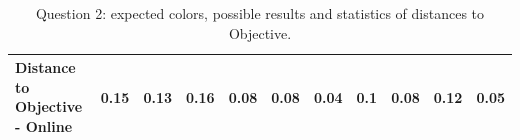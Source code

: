 \begin{table}[H]
{\begin{tabular}{lccccccccccccc}
    \multicolumn{4}{l}{Distance to Objective - Online}                                                                                               & \multicolumn{1}{|c}{0.15}       & \multicolumn{1}{c|}{0.13}    & \multicolumn{1}{|c}{0.16}       & \multicolumn{1}{c|}{0.08}    & \multicolumn{1}{|c}{\textbf{0.08}}       & \multicolumn{1}{c|}{0.04}    & \multicolumn{1}{|c}{0.1}        & \multicolumn{1}{c|}{0.08}    & \multicolumn{1}{|c}{0.12}       & \multicolumn{1}{c|}{0.05}    \\ \hline
    \end{tabular}}
  \caption[Question 2, with expected Results.]{Question 2: expected colors, possible results and statistics of distances to Objective.}
  \vspace{-5pt}
  \label{table:lab_q2_expected}
\end{table}
%
